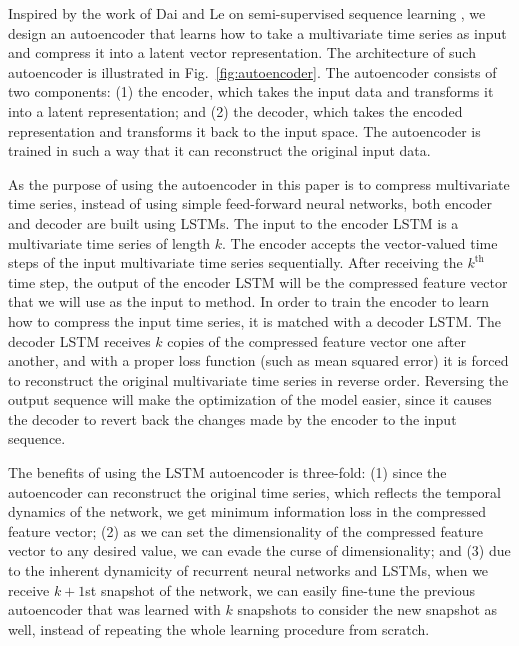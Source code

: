 {\color{red}
Inspired by the work of Dai and Le on semi-supervised sequence learning \cite{dai2015semi}, we design an autoencoder that learns how to take a multivariate time series as input and compress it into a latent vector representation. The architecture of such autoencoder is illustrated in Fig.~\ref{fig:autoencoder}. The autoencoder consists of two components: (1) the encoder, which takes the input data and transforms it into a latent representation; and (2) the decoder, which takes the encoded representation and transforms it back to the input space. The autoencoder is trained in such a way that it can reconstruct the original input data. 

As the purpose of using the autoencoder in this paper is to compress multivariate time series, instead of using simple feed-forward neural networks, both encoder and decoder are built using LSTMs. The input to the encoder LSTM is a multivariate time series of length $k$. The encoder accepts the vector-valued time steps of the input multivariate time series sequentially. After receiving the $k^{\text{th}}$ time step, the output of the encoder LSTM will be the compressed feature vector that we will use as the input to \npglm method. In order to train the encoder to learn how to compress the input time series, it is matched with a decoder LSTM. The decoder LSTM receives $k$ copies of the compressed feature vector one after another, and with a proper loss function (such as mean squared error) it is forced to reconstruct the original multivariate time series in reverse order. Reversing the output sequence will make the optimization of the model easier, since it causes the decoder to revert back the changes made by the encoder to the input sequence.}

The benefits of using the LSTM autoencoder is three-fold: (1) since the autoencoder can reconstruct the original time series, which reflects the temporal dynamics of the network, we get minimum information loss in the compressed feature vector; (2) as we can set the dimensionality of the compressed feature vector to any desired value, we can evade the curse of dimensionality; {\color{red}and (3) due to the inherent dynamicity of recurrent neural networks and LSTMs, when we receive $k+1$st snapshot of the network, we can easily fine-tune the previous autoencoder that was learned with $k$ snapshots to consider the new snapshot as well, instead of repeating the whole learning procedure from scratch.}

